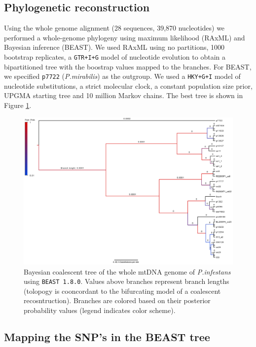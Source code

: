 \documentclass{article}\usepackage[]{graphicx}\usepackage[]{color}
\begin{document}
\subsection{Phylogenetic reconstruction}
Using the whole genome alignment (28 sequences, 39,870 nucleotides) we performed a whole-genome phylogeny using maximum likelihood (RAxML) and Bayesian inference (BEAST). We used RAxML using no partitions, 1000 bootstrap replicates, a \texttt{GTR+I+G} model of nucleotide evolution to obtain a bipartitioned tree with the boostrap values mapped to the branches. For BEAST, we specified \texttt{p7722} (\emph{P.mirabilis}) as the outgroup. We used a \texttt{HKY+G+I} model of nucleotide substitutions, a strict molecular clock, a constant population size prior, UPGMA starting tree and 10 million Markov chains. The best tree is shown in Figure \ref{fig:BEAST}.

\begin{figure}[p]
\centering
\includegraphics[scale=0.3]{Beast_branchlenghts.jpg}
\caption[BEAST Coalescent tree]{Bayesian coalescent tree of the whole mtDNA genome of \emph{P.infestans} using \texttt{BEAST 1.8.0}. Values above branches represent branch lengths (tolopogy is cooncordant to the bifurcating model of a coalescent recosntruction). Branches are colored based on their posterior probability values (legend indicates color scheme).}
\label{fig:BEAST}
\end{figure}

\subsection{Mapping the SNP's in the BEAST tree}
\end{document}
